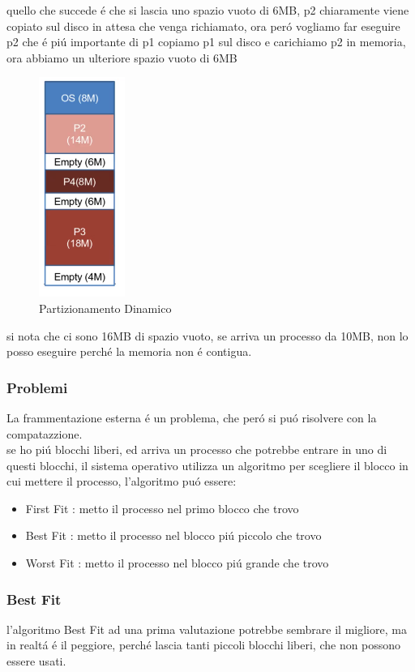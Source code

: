     quello che succede é che si lascia uno spazio vuoto di 6MB, p2 chiaramente viene copiato
    sul disco in attesa che venga richiamato, ora peró vogliamo far eseguire p2 che é piú importante
    di p1 copiamo p1 sul disco e carichiamo p2 in memoria, ora abbiamo un ulteriore spazio vuoto di 6MB
    \begin{figure}[H]
        \centering
        \includegraphics[width=0.25\textwidth]{immagini/EsempioPartizionamentoDinamico3}
        \caption{Partizionamento Dinamico}
    \end{figure}
    si nota che ci sono 16MB di spazio vuoto, se arriva un processo da 10MB, non
    lo posso eseguire perché la memoria non é contigua.
    \subsubsection*{Problemi}
    La frammentazione esterna é un problema, che peró si puó risolvere con la compatazzione. \\

    se ho piú blocchi liberi, ed arriva un processo che potrebbe entrare in uno di questi blocchi, il sistema operativo
    utilizza un algoritmo per scegliere il blocco in cui mettere il processo, l'algoritmo puó essere:
    \begin{itemize}
        \item First Fit : metto il processo nel primo blocco che trovo
        \item Best Fit : metto il processo nel blocco piú piccolo che trovo
        \item Worst Fit : metto il processo nel blocco piú grande che trovo
    \end{itemize}
    \subsubsection*{Best Fit}
    l'algoritmo Best Fit ad una prima valutazione potrebbe sembrare il migliore, ma in realtá é il peggiore, perché
    lascia tanti piccoli blocchi liberi, che non possono essere usati.

